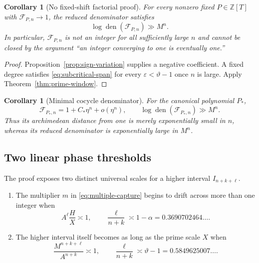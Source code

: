 \documentclass[11pt,oneside]{article}
\newtheorem{corollary}[theorem]{Corollary}
\theoremstyle{definition}
\theoremstyle{remark}
\newcommand{\Z}{\mathbb Z}
\newcommand{\thetaAE}{\vartheta}
\newcommand{\den}{\operatorname{den}}
\newcommand{\cF}{\mathcal F}
\begin{document}
\begin{corollary}[No fixed-shift factorial proof]
\label{cor:no-fixed-factorial}
For every nonzero fixed $P\in\Z[T]$ with
$\cF_{P,n}\to1$, the reduced denominator satisfies
\begin{equation}
 \log\den(\cF_{P,n})\gg M^n.
 \label{eq:no-fixed-factorial}
\end{equation}
In particular, $\cF_{P,n}$ is not an integer for all sufficiently large $n$ and cannot be
closed by the argument ``an integer converging to one is eventually one.''
\end{corollary}

\begin{proof}
Proposition~\ref{prop:sign-variation} supplies a negative coefficient.  A fixed degree
satisfies \eqref{eq:subcritical-span} for every $\varepsilon<\thetaAE-1$ once $n$ is large.
Apply Theorem~\ref{thm:prime-window}.
\end{proof}

\begin{corollary}[Minimal cocycle denominator]
\label{cor:minimal-denominator}
For the canonical polynomial $P_*$,
\begin{equation}
 \cF_{P_*,n}=1+C_*\eta^n+o(\eta^n),
 \qquad
 \log\den(\cF_{P_*,n})\gg M^n.
 \label{eq:minimal-gap-den}
\end{equation}
Thus its archimedean distance from one is merely exponentially small in $n$, whereas its
reduced denominator is exponentially large in $M^n$.
\end{corollary}

\subsection{Two linear phase thresholds}

The proof exposes two distinct universal scales for a higher interval $I_{n+k+\ell}$.

\begin{enumerate}
\item The multiplier $m$ in \eqref{eq:multiple-capture} begins to drift across more than one
integer when
\begin{equation}
 A^\ell\frac HX\asymp1,
 \qquad
 \frac\ell{n+k}\asymp1-\alpha
 =0.3690702464\ldots.
 \label{eq:drift-threshold}
\end{equation}

\item The higher interval itself becomes as long as the prime scale $X$ when
\begin{equation}
 \frac{M^{n+k+\ell}}{A^{n+k}}\asymp1,
 \qquad
 \frac\ell{n+k}\asymp\thetaAE-1
 =0.5849625007\ldots.
 \label{eq:thickness-threshold}
\end{equation}
\end{enumerate}
\end{document}
